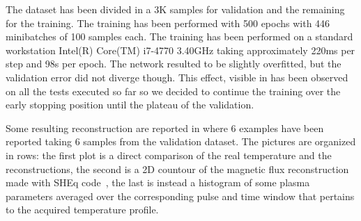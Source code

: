 The dataset has been divided in a 3K samples for validation and the remaining for the training. The training has been performed with 500 epochs with 446 minibatches of 100 samples each. The training has been performed on a standard workstation Intel(R) Core(TM) i7-4770 3.40GHz taking approximately 220ms per step and 98s per epoch. The network resulted to be slightly overfitted, but the validation error did not diverge though. This effect, visible in \Figure{\ref{fig:fig:step_12_7_p}} has been observed on all the tests executed so far so we decided to continue the training over the early stopping position until the plateau of the validation.

Some resulting reconstruction are reported in \Figure{\ref{fig:Step_12_val}} where 6 examples have been reported taking 6 samples from the validation dataset. The pictures are organized in rows: the first plot is a direct comparison of the real temperature and the reconstructions, the second is a 2D countour of the magnetic flux reconstruction made with SHEq code~\cite{Martines_2011}, the last is instead a histogram of some plasma parameters averaged over the corresponding pulse and time window that pertains to the acquired temperature profile.
%
